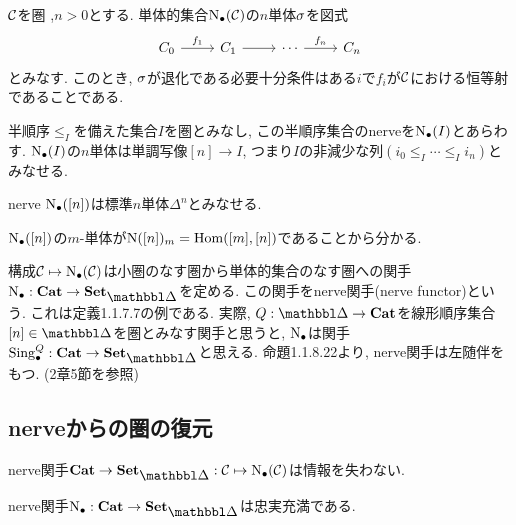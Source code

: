 \documentclass[uplatex, a4paper, 14Q, dvipdfmx]{jsreport}
\begin{document}
\begin{remark}
  $\mathcal{C}$を圏 ,$n>0$とする. 
  単体的集合$\mathrm{N}_{\bullet}(\mathcal{C})$の$n$単体$\sigma$を図式
  \[\begin{tikzcd}
    {C_0} & {C_1} & \cdots & {C_n}
    \arrow[from=1-2, to=1-3]
    \arrow["{f_n}", from=1-3, to=1-4]
    \arrow["{f_1}", from=1-1, to=1-2]
  \end{tikzcd}\]
  とみなす. 
  このとき, $\sigma$が退化である必要十分条件はある$i$で$f_i$が$\mathcal{C}$における恒等射であることである. 
\end{remark}

\begin{remark}
  半順序$\leq_I$を備えた集合$I$を圏とみなし, この半順序集合のnerveを$\mathrm{N}_{\bullet}(I)$とあらわす. 
  $\mathrm{N}_{\bullet}(I)$の$n$単体は単調写像$[n] \to I$, つまり$I$の非減少な列$(i_0 \leq_I \cdots \leq_I i_n)$とみなせる. 
\end{remark}

\begin{example}
  nerve $\mathrm{N}_{\bullet}([n])$は標準$n$単体$\Delta^n$とみなせる. 
\end{example}

\begin{Proof}
  $\mathrm{N}_{\bullet}([n])$の$m$-単体が$\mathrm{N}([n])_m=\mathrm{Hom}([m],[n])$であることから分かる. 
\end{Proof}

\begin{remark}
  構成$\mathcal{C} \mapsto \mathrm{N}_{\bullet}(\mathcal{C})$は小圏のなす圏から単体的集合のなす圏への関手$\N: \cat \to \sset$を定める. 
  この関手をnerve関手(nerve functor)という. 
  これは定義1.1.7.7の例である. 
  実際, $Q:\csim \to \cat$を線形順序集合$[n] \in \csim$を圏とみなす関手と思うと, $\mathrm{N}_{\bullet}$は関手$\Sing_\bullet^Q: \cat \to \sset$と思える. 
  命題1.1.8.22より, nerve関手は左随伴をもつ. (2章5節を参照)
\end{remark}

\subsection{nerveからの圏の復元}

nerve関手$\cat \to \sset: \calC \mt \N(\calC)$は情報を失わない. 

\begin{prop}
  nerve関手$\N: \cat \to \sset$は忠実充満である. 
\end{prop}

\begin{Proof}
  
\end{Proof}
\end{document}
